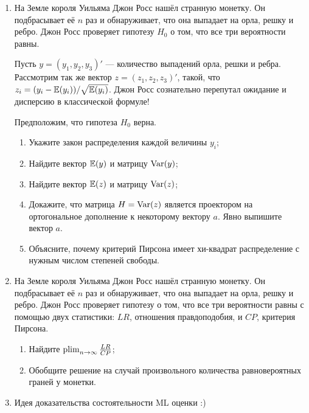 \begin{enumerate}
\item На Земле короля Уильяма Джон Росс нашёл странную монетку. 
Он подбрасывает её $n$ раз и обнаруживает, что она выпадает на орла, решку и ребро. 
Джон Росс проверяет гипотезу $H_0$ о том, что все три вероятности равны.

Пусть $y = (y_1, y_2, y_3)'$ — количество выпадений орла, решки и ребра. Рассмотрим так же вектор
$z = (z_1, z_2, z_3)'$, такой, что $z_i = (y_i - \operatorname{\mathbb{E}}(y_i)) / \sqrt{\operatorname{\mathbb{E}}(y_i)}$. 
Джон Росс сознательно перепутал ожидание и дисперсию в классической формуле!

Предположим, что гипотеза $H_0$ верна.
\begin{enumerate}
    \item Укажите закон распределения каждой величины $y_i$;
    \item Найдите вектор $\operatorname{\mathbb{E}}(y)$ и матрицу $\operatorname{Var}(y)$;
    \item Найдите вектор $\operatorname{\mathbb{E}}(z)$ и матрицу $\operatorname{Var}(z)$;
    \item Докажите, что матрица $H=\operatorname{Var}(z)$ является проектором на ортогональное дополнение к некоторому вектору $a$. 
  Явно выпишите вектор $a$.
  \item Объясните, почему критерий Пирсона имеет хи-квадрат распределение с нужным числом степеней свободы.
\end{enumerate}

\newpage

\item На Земле короля Уильяма Джон Росс нашёл странную монетку. 
Он подбрасывает её $n$ раз и обнаруживает, что она выпадает на орла, решку и ребро. 
Джон Росс проверяет гипотезу о том, что все три вероятности равны с помощью двух статистики: 
$LR$, отношения правдоподобия, и $CP$, критерия Пирсона. 

\begin{enumerate}
\item Найдите $\operatorname*{plim}_{n\to\infty} \frac{LR}{CP}$;
\item Обобщите решение на случай произвольного количества равновероятных граней у монетки.    
\end{enumerate}

\item Идея доказательства состоятельности ML оценки :)


\end{enumerate}
